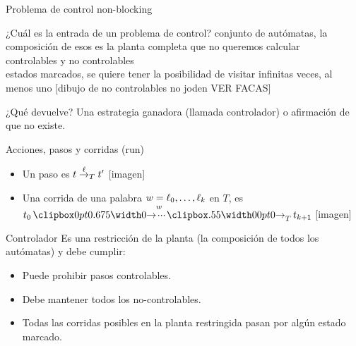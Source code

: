 \begin{frame}{Problema de control non-blocking}
    \begin{block}{¿Cuál es la entrada de un problema de control?}
        conjunto de autómatas, la composición de esos es la planta completa que no queremos calcular\\
        controlables y no controlables\\
        estados marcados, se quiere tener la posibilidad de visitar infinitas veces, al menos uno
        [dibujo de no controlables no joden VER FACAS]
    \end{block}

    \begin{block}{¿Qué devuelve?}
        Una estrategia ganadora (llamada controlador) o afirmación de que no existe.
    \end{block}

\end{frame}
\begin{frame}{Acciones, pasos y corridas (run)}
    \begin{itemize}
     \item Un paso es $t \overset{\ell}{\rightarrow}_{T} t'$ [imagen]
     \item Una corrida de una palabra $w = \ell_0,\ldots,\ell_k$ en $T$, es $t_0 \runw{w}{T} t_{k+1}$ [imagen]
    \end{itemize}
\end{frame}
\begin{frame}{Controlador}
    Es una restricción de la planta (la composición de todos los autómatas) y debe cumplir:

    \begin{itemize}
     \item Puede prohibir pasos controlables.
     \item Debe mantener todos los no-controlables.
     \item Todas las corridas posibles en la planta restringida pasan por algún estado marcado.
    \end{itemize}
\end{frame}
